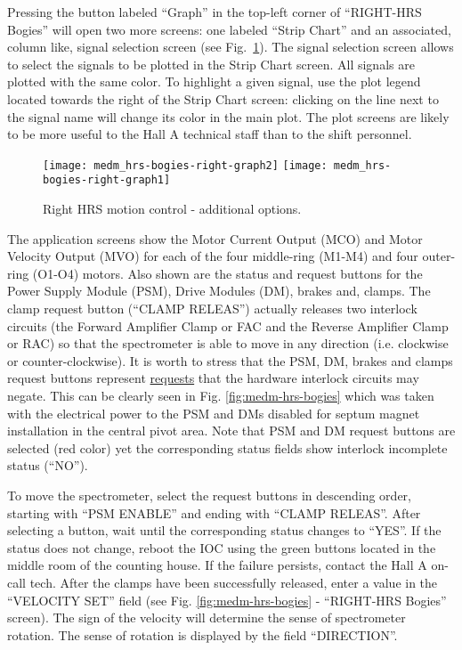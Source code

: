 {{Pressing the button labeled ``Graph'' in the top-left corner of ``RIGHT-HRS Bogies''
will open two more screens: one labeled ``Strip Chart'' and an associated, column like,
signal selection screen (see Fig.~\ref{fig:medm-hrs-bogies-graph}).
The signal selection screen allows to select the signals
to be plotted in the Strip Chart screen. All signals are plotted with the same color.
To highlight a given signal,
use the plot legend located towards the right of the Strip Chart screen: clicking on the line next
to the signal name will change its color in the main plot.
The plot screens are likely to be more useful to the Hall A technical staff than to the
shift personnel.
\begin{figure}[htb]
\begin{center}
    \texttt{[image: medm\_hrs-bogies-right-graph2]}
    \texttt{[image: medm\_hrs-bogies-right-graph1]}
\caption[Right HRS Motion Control - additional options]{Right HRS motion control - additional options.}
\label{fig:medm-hrs-bogies-graph}
\end{center}
\end{figure}


The application screens show the Motor Current Output (MCO) and Motor Velocity Output (MVO) for each
of the four middle-ring (M1-M4) and four outer-ring (O1-O4) motors.
Also shown are the status and request buttons for the Power Supply Module (PSM),
Drive Modules (DM),
brakes and, clamps. The clamp request button (``CLAMP RELEAS'') actually releases two interlock
circuits (the Forward Amplifier Clamp or FAC and the Reverse Amplifier Clamp or RAC)
so that the spectrometer is
able to move in any direction (i.e. clockwise or counter-clockwise).
It is worth to stress that the PSM, DM, brakes and clamps request buttons represent
\underline{requests} that the hardware interlock circuits may negate. This can be clearly
seen 
in Fig. \ref{fig:medm-hrs-bogies} which was taken with
the electrical power to the PSM and DMs disabled for septum magnet installation
in the central pivot area. Note that PSM and DM request buttons are selected (red color)
yet the corresponding status fields show interlock incomplete status (``NO'').

To move the spectrometer, select the request buttons in descending order, starting with
``PSM ENABLE'' and ending with ``CLAMP RELEAS''. After selecting a button, wait
until the corresponding status changes to ``YES''. 
If the status does not change, reboot
the IOC using the green buttons located in the middle room of the counting house.
If the failure persists, contact the Hall A on-call tech.
After the clamps have been successfully released, enter a value in the ``VELOCITY SET'' field
(see Fig. \ref{fig:medm-hrs-bogies} - ``RIGHT-HRS Bogies'' screen).
The sign of the velocity
will determine the sense of spectrometer rotation. The sense of rotation is displayed by the
field ``DIRECTION''.

}}
